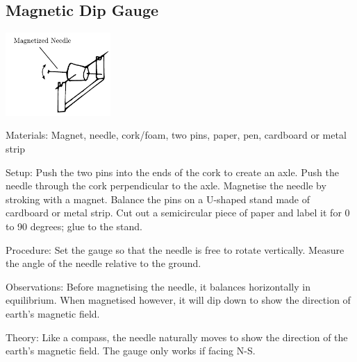 \begin{multicols}{2}
\subsection{Magnetic Dip Gauge}

\begin{center}
\includegraphics[width=0.3\textwidth]{./img/magnetic-dip-gauge.png}
\end{center}

\begin{description*}
\item[Materials:]{Magnet, needle, cork/foam, two pins, paper, pen, cardboard or metal strip}
\item[Setup:]{Push the two pins into the ends of the cork to create an axle. Push the needle through the cork perpendicular to the axle. Magnetise the needle by stroking with a magnet. Balance the pins on a U-shaped stand made of cardboard or metal strip. Cut out a semicircular piece of paper and label it for 0 to 90 degrees; glue to the stand.}
\item[Procedure:]{Set the gauge so that the needle is free to rotate vertically. Measure the angle of the needle relative to the ground.}
\item[Observations:]{Before magnetising the needle, it balances horizontally in equilibrium. When magnetised however, it will dip down to show the direction of earth's magnetic field.}
\item[Theory:]{Like a compass, the needle naturally moves to show the direction of the earth's magnetic field. The gauge only works if facing N-S.}
\end{description*}





\end{multicols}

\pagebreak
